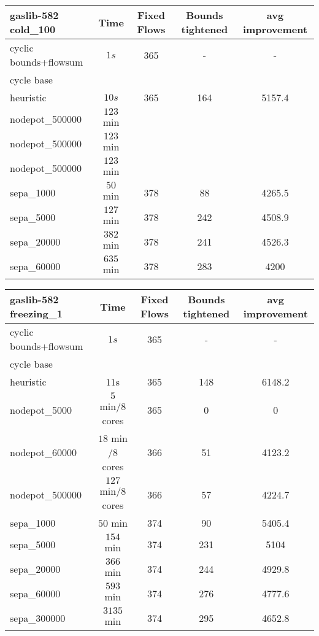 \begin{center}
\begin{tabular}{ l | c | c | c | c }

\textbf{gaslib-582 cold\_100} & Time  & Fixed Flows & Bounds tightened & avg improvement\\
\hline
 cyclic bounds+flowsum& $1s$ & 365 & - & -  \\
 cycle base& $ $ &  &  & \\
 heuristic& $ 10s $& 365& 164 & 5157.4\\
 nodepot\_500000& $123$ min &  &  &   \\ 
 nodepot\_500000& $123$ min &  &  &   \\ 
 nodepot\_500000& $123$ min &  &  &   \\ 
 sepa\_1000& $50$ min  & 378 & 88 & 4265.5 \\
 sepa\_5000& $ 127$ min & 378 & 242 & 4508.9  \\
 sepa\_20000& $ 382$ min &  378& 241 & 4526.3  \\
 sepa\_60000& $635$ min  & 378& 283& 4200\\
\end{tabular} 
\end{center}

\begin{center}
\begin{tabular}{ l | c | c | c | c }

\textbf{gaslib-582 freezing\_1} & Time  & Fixed Flows & Bounds tightened & avg improvement\\
\hline
 cyclic bounds+flowsum& $1s$ & 365 & - & - \\
 cycle base& $ $ &  &  & \\
 heuristic& $ 11$s& 365& 148 & 6148.2\\
 nodepot\_5000& $ 5$ min/8 cores & 365 & 0 & 0 \\ 
 nodepot\_60000& $18$ min /8 cores & 366 & 51 & 4123.2 \\ 
 nodepot\_500000& $127$ min/8 cores &366  & 57 & 4224.7 \\ 
 sepa\_1000& $50$ min & 374 & 90 & 5405.4 \\
 sepa\_5000& $ 154$ min & 374 & 231 & 5104  \\
 sepa\_20000& $366$ min & 374 & 244 & 4929.8 \\
 sepa\_60000& $593$ min & 374 & 276 & 4777.6\\
 sepa\_300000& $3135$ min & 374 & 295 & 4652.8\\
\end{tabular} 
\end{center}

